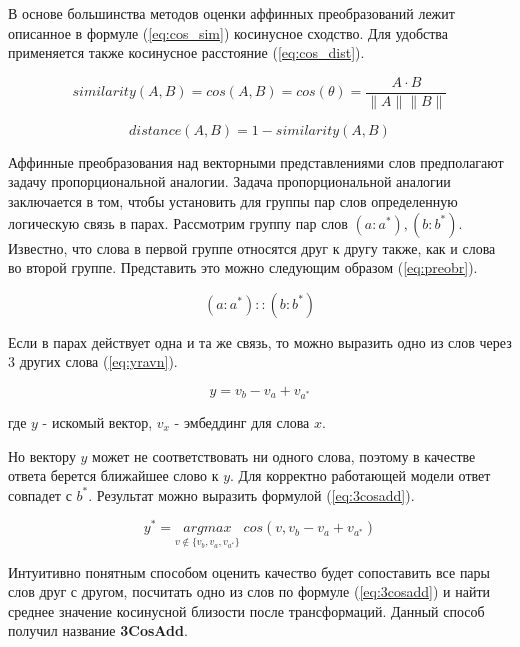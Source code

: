 \documentclass[a4paper,14pt]{article}
\begin{document}
В основе большинства методов оценки аффинных преобразований лежит описанное в формуле (\ref{eq:cos_sim}) косинусное сходство.
Для удобства применяется также косинусное расстояние (\ref{eq:cos_dist}).

\begin{equation}
	similarity(A,B) = cos(A,B) = cos(\theta) = \dfrac{A\cdot B}{\|A\| \|B\|}
	\label{eq:cos_sim}
\end{equation}

\begin{equation}
	distance(A,B) = 1 - similarity(A,B)
	\label{eq:cos_dist}
\end{equation}

Аффинные преобразования над векторными представлениями слов предполагают задачу пропорциональной аналогии.
Задача пропорциональной аналогии заключается в том, чтобы установить для группы пар слов определенную логическую связь в парах.
Рассмотрим группу пар слов $(a: a^*), (b: b^*)$. 
Известно, что слова в первой группе относятся друг к другу также, как и слова во второй группе.
Представить это можно следующим образом (\ref{eq:preobr}).

\begin{equation}
	(a: a^*) :: (b: b^*)
	\label{eq:preobr}
\end{equation}

Если в парах действует одна и та же связь, то можно выразить одно из слов через 3 других слова (\ref{eq:yravn}).

\begin{equation}
	y = v_b - v_a + v_{a^*}
	\label{eq:yravn}
\end{equation}

где 
$y$ - искомый вектор,
$v_x$ - эмбеддинг для слова $x$.

Но вектору $y$ может не соответствовать ни одного слова, поэтому в качестве ответа берется ближайшее слово к $y$.
Для корректно работающей модели ответ совпадет с $b^*$.
Результат можно выразить формулой (\ref{eq:3cosadd}).

\begin{equation}
	y^* = \underset{v \notin \{v_b, v_a, v_{a^*}\}}{argmax} \; cos(v, v_b - v_a + v_{a^*})
	\label{eq:3cosadd}
\end{equation}


Интуитивно понятным способом оценить качество будет сопоставить все пары слов друг с другом, посчитать одно из слов по формуле (\ref{eq:3cosadd}) \cite{21} и найти среднее значение косинусной близости после трансформаций.
Данный способ получил название \textbf{3CosAdd}.
\end{document}
